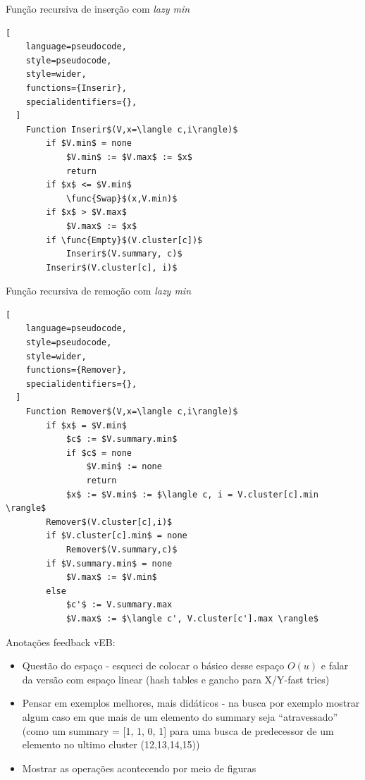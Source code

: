 \begin{programruledcaption}{Função recursiva de inserção com \emph{lazy min} \label{p:veb-final-insert-1}}
  \begin{lstlisting}[
    language=pseudocode,
    style=pseudocode,
    style=wider,
    functions={Inserir},
    specialidentifiers={},
  ]
    Function Inserir$(V,x=\langle c,i\rangle)$
        if $V.min$ = none
            $V.min$ := $V.max$ := $x$
            return
        if $x$ <= $V.min$
            \func{Swap}$(x,V.min)$
        if $x$ > $V.max$
            $V.max$ := $x$
        if \func{Empty}$(V.cluster[c])$
            Inserir$(V.summary, c)$
        Inserir$(V.cluster[c], i)$
  \end{lstlisting}
\end{programruledcaption}

\begin{programruledcaption}{Função recursiva de remoção com \emph{lazy min} \label{p:veb-final-remove}}
  \begin{lstlisting}[
    language=pseudocode,
    style=pseudocode,
    style=wider,
    functions={Remover},
    specialidentifiers={},
  ]
    Function Remover$(V,x=\langle c,i\rangle)$
        if $x$ = $V.min$
            $c$ := $V.summary.min$
            if $c$ = none 
                $V.min$ := none
                return
            $x$ := $V.min$ := $\langle c, i = V.cluster[c].min \rangle$
        Remover$(V.cluster[c],i)$
        if $V.cluster[c].min$ = none
            Remover$(V.summary,c)$
        if $V.summary.min$ = none
            $V.max$ := $V.min$
        else 
            $c'$ := V.summary.max
            $V.max$ := $\langle c', V.cluster[c'].max \rangle$
  \end{lstlisting}
\end{programruledcaption}

Anotações feedback vEB:
\begin{itemize}
    \item Questão do espaço - esqueci de colocar o básico desse espaço $O(u)$ e falar da versão com espaço linear (hash tables e gancho para X/Y-fast tries)
    \item Pensar em exemplos melhores, mais didáticos - na busca por exemplo mostrar algum caso em que mais de um elemento do summary seja ``atravessado''  (como um summary = [1, 1, 0, 1] para uma busca de predecessor de um elemento no ultimo cluster (12,13,14,15))
    \item Mostrar as operações acontecendo por meio de figuras
\end{itemize}
